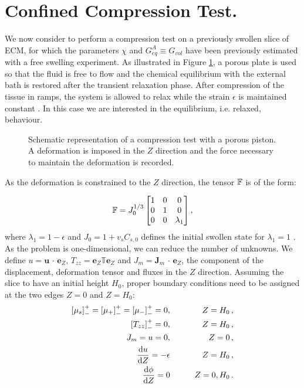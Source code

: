 \section{Confined Compression Test.}
\label{excomp}
We now consider to perform a compression test on a previously swollen slice of ECM, for which the parameters $\chi$ and $G^A_{eq}\equiv G_{vol}$ have been previously estimated with a free swelling experiment. As illustrated in Figure \ref{confcomp}, a porous plate is used so that the fluid is free to flow and the chemical equilibrium with the external bath is restored after the transient relaxation phase. After compression of the tissue in ramps, the system is allowed to relax while the strain $\epsilon$ is maintained constant \cite{Netti}. In this case we are interested in the equilibrium, i.e. relaxed, behaviour. 

\begin{figure}[h]
	\centering
	\def\svgwidth{0.89\linewidth}
	
	\vspace{2mm}
	\caption{Schematic representation of a compression test with a porous piston. A deformation is imposed in the $Z$ direction and the force necessary to maintain the deformation is recorded. }
	\label{confcomp}
\end{figure}

As the deformation is constrained to the $Z$ direction, the tensor $\mathbb{F}$ is of the form:

\begin{equation}
\mathbb{F}=J_0^{1/3}\begin{bmatrix}
1 &0&0\\
0&1&0\\
0&0& \lambda_1
\end{bmatrix},
\label{F} 
\end{equation}
where $\lambda_1 = 1 - \epsilon$ and $J_0=1+v_sC_{s,0}$ defines the initial swollen state for $\lambda_1=1$ . As the problem is one-dimensional, we can reduce the number of unknowns. We define $u=\mathbf{u}\,\cdot\,\mathbf{e}_Z$, $T_{zz}= \mathbf{e}_Z \mathbb{T}\mathbf{e}_Z$ and $J_m=\mathbf{J}_m\,\cdot \,\mathbf{e}_Z$, the component of the displacement, deformation tensor and fluxes in the $Z$ direction. Assuming the slice to have an initial height $H_0$, proper boundary conditions need to be assigned at the two edges $Z=0$ and $Z=H_0$:
\begin{eqnarray}
\left[\mu_s\right]^+_-=\left[\mu_+\right]^+_-=\left[\mu_-\right]^+_-=0, &\qquad& Z=H_0\,,\\
\quad \left[T_{zz}\right]^+_-=0, &\qquad& Z=H_0\,,\\
J_m = u= 0, &\qquad& Z=0\, ,\\
\frac{\text{d} u}{\text{d} Z}=-\epsilon &\qquad& Z=H_0\,,\\
\frac{\text{d} \phi}{\text{d} Z}=0 &\qquad& Z=0,H_0\,.
\end{eqnarray}

